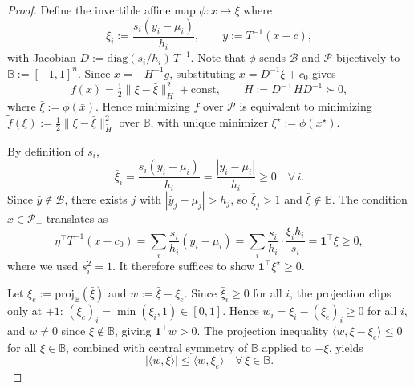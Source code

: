 \documentclass[pdflatex,sn-mathphys-num]{sn-jnl}%
\theoremstyle{thmstyleone}%
\theoremstyle{thmstyletwo}%
\theoremstyle{thmstylethree}%
\theoremstyle{thmstylethree}%
\begin{document}
\begin{proof}
Define the invertible affine map $\phi\colon x\mapsto\xi$ where
\[
  \xi_i := \frac{s_i(y_i-\mu_i)}{h_i},
  \qquad y := T^{-1}(x-c),
\]
with Jacobian $D := \mathrm{diag}(s_i/h_i)\,T^{-1}$.
Note that $\phi$ sends $\mathcal{B}$ and $\mathcal{P}$ bijectively to
$\mathbb{B} := [-1,1]^n$.
Since $\bar{x} = -H^{-1}g$, substituting $x = D^{-1}\xi + c_0$ gives
\[
  f(x) = \tfrac{1}{2}\|\xi - \bar\xi\|_{\tilde{H}}^2 + \mathrm{const},
  \qquad \tilde{H} := D^{-\top}HD^{-1} \succ 0,
\]
where $\bar\xi := \phi(\bar{x})$. Hence minimizing $f$ over $\mathcal{P}$
is equivalent to minimizing $\tilde{f}(\xi) :=
\tfrac{1}{2}\|\xi-\bar\xi\|_{\tilde{H}}^2$ over $\mathbb{B}$, with unique
minimizer $\xi^\star := \phi(x^\star)$.

\smallskip\noindent
By definition of $s_i$,
\[
  \bar\xi_i = \frac{s_i(\bar{y}_i-\mu_i)}{h_i}
            = \frac{|\bar{y}_i-\mu_i|}{h_i} \geq 0 \quad\forall\,i.
\]
Since $\bar{y}\notin\mathcal{B}$, there exists $j$ with
$|\bar{y}_j-\mu_j|>h_j$, so $\bar\xi_j>1$ and $\bar\xi\notin\mathbb{B}$.
The condition $x\in\mathcal{P}_+$ translates as
\[
  \eta^\top T^{-1}(x-c_0)
  = \sum_i \frac{s_i}{h_i}(y_i-\mu_i)
  = \sum_i \frac{s_i}{h_i}\cdot\frac{\xi_i h_i}{s_i}
  = \mathbf{1}^\top\xi \ge 0,
\]
where we used $s_i^2=1$. It therefore suffices to show
$\mathbf{1}^\top\xi^\star\ge 0$.

\smallskip\noindent
Let $\xi_e := \mathrm{proj}_{\mathbb{B}}(\bar\xi)$ and $w := \bar\xi-\xi_e$.
Since $\bar\xi_i\ge 0$ for all $i$, the projection clips only at $+1$:
$(\xi_e)_i = \min(\bar\xi_i,1)\in[0,1]$.
Hence $w_i = \bar\xi_i - (\xi_e)_i \ge 0$ for all $i$, and
$w\ne 0$ since $\bar\xi\notin\mathbb{B}$, giving $\mathbf{1}^\top w > 0$.
The projection inequality $\langle w,\xi-\xi_e\rangle\le 0$ for all
$\xi\in\mathbb{B}$, combined with central symmetry of $\mathbb{B}$ applied to $-\xi$,
yields
\begin{equation*} 
  |\langle w,\xi\rangle| \le \langle w,\xi_e\rangle
  \quad\forall\,\xi\in\mathbb{B}.
\end{equation*}


\end{proof}
\end{document}
